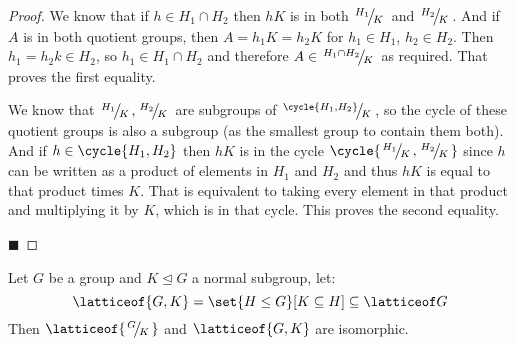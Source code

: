\documentclass[10pt]{article}
\def\slfrac#1#2{\left.{}^{#1}\mkern-4mu\middle/\mkern-3mu{}_{#2}\right.}
\let\normalsub=\trianglelefteq
\begin{document}
\begin{proof}

    We know that if $h\in H_1\cap H_2$ then $hK$ is in both $\slfrac{H_1}K$ and $\slfrac{H_2}K$.
    And if $A$ is in both quotient groups, then $A=h_1K=h_2K$ for $h_1\in H_1$, $h_2\in H_2$.
    Then $h_1=h_2k\in H_2$, so $h_1\in H_1\cap H_2$ and therefore $A\in\slfrac{H_1\cap H_2}K$ as required.
    That proves the first equality.

    We know that $\slfrac{H_1}K,\slfrac{H_2}K$ are subgroups of $\slfrac{\cycle{H_1, H_2}}K$, so the cycle of these quotient groups is also a subgroup (as the smallest group to contain them both).
    And if $h\in\cycle{H_1, H_2}$ then $hK$ is in the cycle $\cycle{\slfrac{H_1}K, \slfrac{H_2}K}$ since $h$ can be written as a product of elements in $H_1$ and $H_2$ and thus $hK$ is equal to that
    product times $K$.
    That is equivalent to taking every element in that product and multiplying it by $K$, which is in that cycle.
    This proves the second equality.

    \hfill$\blacksquare$

\end{proof}

\begin{thrm*}

    Let $G$ be a group and $K\normalsub G$ a normal subgroup, let:
    \[ \latticeof{G, K} = \set{H\leq G}[K\subseteq H] \subseteq \latticeof G \]
    Then $\latticeof{\slfrac GK}$ and $\latticeof{G,K}$ are isomorphic.

\end{thrm*}
\end{document}

